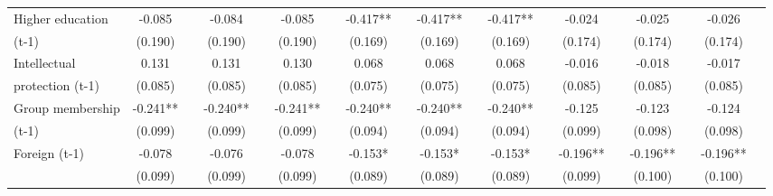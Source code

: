 \begin{table}[htbp]
\begin{tabular}{l*{18}{c}}
Higher education    &      -0.085   &               &      -0.084   &               &      -0.085   &               &      -0.417** &               &      -0.417** &               &      -0.417** &               &      -0.024   &               &      -0.025   &               &      -0.026   &               \\
(t-1)               &     (0.190)   &               &     (0.190)   &               &     (0.190)   &               &     (0.169)   &               &     (0.169)   &               &     (0.169)   &               &     (0.174)   &               &     (0.174)   &               &     (0.174)   &               \\
Intellectual        &       0.131   &               &       0.131   &               &       0.130   &               &       0.068   &               &       0.068   &               &       0.068   &               &      -0.016   &               &      -0.018   &               &      -0.017   &               \\
protection (t-1)    &     (0.085)   &               &     (0.085)   &               &     (0.085)   &               &     (0.075)   &               &     (0.075)   &               &     (0.075)   &               &     (0.085)   &               &     (0.085)   &               &     (0.085)   &               \\
Group membership    &      -0.241** &               &      -0.240** &               &      -0.241** &               &      -0.240** &               &      -0.240** &               &      -0.240** &               &      -0.125   &               &      -0.123   &               &      -0.124   &               \\
(t-1)               &     (0.099)   &               &     (0.099)   &               &     (0.099)   &               &     (0.094)   &               &     (0.094)   &               &     (0.094)   &               &     (0.099)   &               &     (0.098)   &               &     (0.098)   &               \\
Foreign (t-1)       &      -0.078   &               &      -0.076   &               &      -0.078   &               &      -0.153*  &               &      -0.153*  &               &      -0.153*  &               &      -0.196** &               &      -0.196** &               &      -0.196** &               \\
                    &     (0.099)   &               &     (0.099)   &               &     (0.099)   &               &     (0.089)   &               &     (0.089)   &               &     (0.089)   &               &     (0.099)   &               &     (0.100)   &               &     (0.100)   &               \\

\end{tabular}
\end{table}
